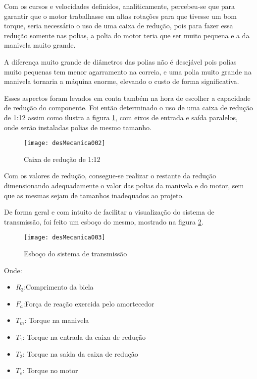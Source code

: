 		Com os cursos e velocidades definidos, analiticamente, percebeu-se que para garantir que o motor trabalhasse em altas rotações para que tivesse um bom torque, seria necessário o uso de uma caixa de redução, pois para fazer essa redução somente nas polias, a polia do motor teria que ser muito pequena e a da manivela muito grande. 

		A diferença muito grande de diâmetros das polias não é desejável pois polias muito pequenas tem menor agarramento na correia, e uma polia muito grande na manivela tornaria a máquina enorme, elevando o custo de forma significativa.

		Esses aspectos foram levados em conta também na hora de escolher a capacidade de redução do componente. Foi então determinado o uso de uma caixa de redução de 1:12 assim como ilustra a figura \ref{desMecanica002}, com eixos de entrada e saída paralelos, onde serão instaladas polias de mesmo tamanho.

		\begin{figure}[h]
			\centering
			\texttt{[image: desMecanica002]}
			\caption{Caixa de redução de 1:12}
			\label{desMecanica002}
		\end{figure}

		Com os valores de redução, consegue-se realizar o restante da redução dimensionando adequadamente o valor das polias da manivela e do motor, sem que as mesmas sejam de tamanhos inadequados ao projeto.

		De forma geral e com intuito de facilitar a visualização do sistema de transmissão, foi feito um esboço do mesmo, mostrado na figura \ref{desMecanica003}.

		\begin{figure}[h]
			\centering
			\texttt{[image: desMecanica003]}
			\caption{Esboço do sistema de transmissão}
			\label{desMecanica003}
		\end{figure}

		Onde:
		\begin{itemize}
			\item $R_{3}$:Comprimento da biela
			\item $F_{a}$:Força de reação exercida pelo amortecedor
			\item $T_{m}$: Torque na manivela
			\item $T_{1}$: Torque na entrada da caixa de redução
			\item $T_{2}$: Torque na saída da caixa de redução
			\item $T_{e}$: Torque no motor
		\end{itemize}

